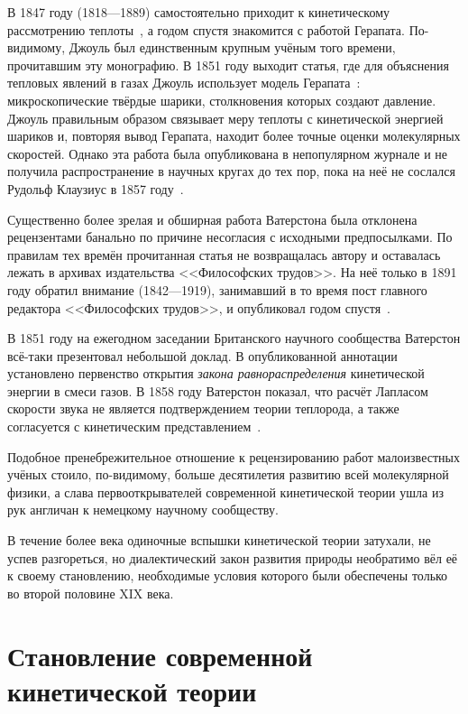 \documentclass[a4paper, 12pt, oneside]{article} %
\begin{document}
В 1847 году  (1818---1889) самостоятельно приходит
к кинетическому рассмотрению теплоты~\cite{joule2003matter}, а годом
спустя знакомится с работой Герапата. По-видимому, Джоуль был
единственным крупным учёным того времени, прочитавшим эту монографию. В
1851 году выходит статья, где для объяснения тепловых явлений в газах
Джоуль использует модель Герапата~\cite{joule1851remarks}:
микроскопические твёрдые шарики, столкновения которых создают давление.
Джоуль правильным образом связывает меру теплоты с кинетической энергией
шариков и, повторяя вывод Герапата, находит более точные оценки
молекулярных скоростей. Однако эта работа была опубликована в
непопулярном журнале и не получила распространение в научных кругах до
тех пор, пока на неё не сослался Рудольф Клаузиус в 1857
году~\cite{clausius1857heat}.

Существенно более зрелая и обширная работа Ватерстона была отклонена
рецензентами банально по причине несогласия с исходными предпосылками.
По правилам тех времён прочитанная статья не возвращалась автору и
оставалась лежать в архивах издательства <<Философских трудов>>. На неё
только в 1891 году обратил внимание  (1842---1919),
занимавший в то время пост главного редактора <<Философских трудов>>, и
опубликовал годом спустя~\cite{waterston1892physics}.

В 1851 году на ежегодном заседании Британского научного сообщества
Ватерстон всё-таки презентовал небольшой доклад. В опубликованной
аннотации~\cite{waterston1851general} установлено первенство открытия
\emph{закона равнораспределения} кинетической энергии в смеси газов. В
1858 году Ватерстон показал, что расчёт Лапласом скорости звука не
является подтверждением теории теплорода, а также согласуется с
кинетическим представлением~\cite{waterston1858sound}.

Подобное пренебрежительное отношение к рецензированию работ
малоизвестных учёных стоило, по-видимому, больше десятилетия развитию
всей молекулярной физики, а слава первооткрывателей современной
кинетической теории ушла из рук англичан к немецкому научному
сообществу.

В течение более века одиночные вспышки кинетической теории затухали, не
успев разгореться, но диалектический закон развития природы необратимо
вёл её к своему становлению, необходимые условия которого были
обеспечены только во второй половине XIX века.

\section{Становление современной кинетической теории}
\end{document}
